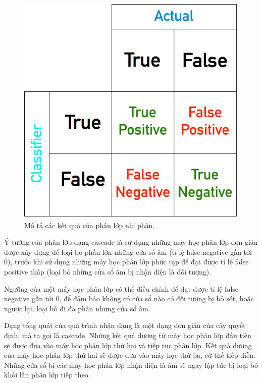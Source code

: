 \documentclass[14pt, oneside, a4paper, openany]{scrartcl}
\begin{document}
\begin{figure}[!h]
	\centering
	\includegraphics[scale=0.5]{figures/binaryclassifier.png} 
	\caption[Mô tả các kết quả của phân lớp nhị phân]{Mô tả các kết quả của phân lớp nhị phân.}
\end{figure}

Ý tưởng của phân lớp dạng cascade là sử dụng những máy học phân lớp đơn giản được xây dựng để loại bỏ phần lớn những cửa sổ âm (tỉ lệ false negative gần tới 0), trước khi sử dụng những máy học phân lớp phức tạp để đạt được tỉ lệ false positive thấp (loại bỏ những cửa sổ âm bị nhận diện là đối tượng).

Ngưỡng của một máy học phân lớp có thể điều chỉnh để đạt được tỉ lệ false negative gần tới 0, để đảm bảo không có cửa sổ nào có đối tượng bị bỏ sót, hoặc ngược lại, loại bỏ đi đa phần nhưng cửa sổ âm.

Dạng tổng quát của quá trình nhận dạng là một dạng đơn giản của cây quyết định, mà ta gọi là cascade. Những kết quả dương từ máy học phân lớp đầu tiên sẽ được đưa vào máy học phân lớp thứ hai và tiếp tục phân lớp. Kết quả dương của máy học phân lớp thứ hai sẽ được đưa vào máy học thứ ba, cứ thế tiếp diễn. Những cửa sổ bị các máy học phân lớp nhận diện là âm sẽ ngay lập tức bị loại bỏ khỏi lần phân lớp tiếp theo.
\end{document}
